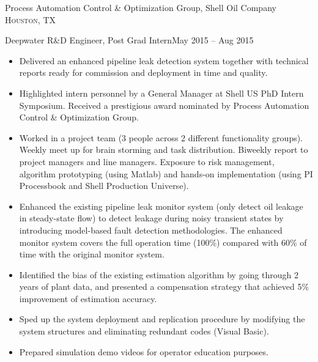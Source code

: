 \documentclass[10pt,a4paper]{article}
\begin{document}
  \headedsection
  {Process Automation Control \& Optimization Group, Shell Oil Company}
  {\textsc{Houston, TX}}
  {
    \headedsubsection
    {Deepwater R\&D Engineer, Post Grad Intern}{May 2015 -- Aug 2015}
    {
      \begin{itemize}
      \item Delivered an enhanced pipeline leak detection system together with
        technical reports ready for commission and deployment in time and
        quality.
        
      \item Highlighted intern personnel by a General Manager at Shell US PhD
        Intern Symposium. Received a prestigious award nominated by Process
        Automation Control \& Optimization Group. 
        
      \item Worked in a project team (3 people across 2 different functionality
        groups). Weekly meet up for brain storming and task distribution. Biweekly
        report to project managers and line managers. Exposure to risk management,
        algorithm prototyping (using Matlab) and hands-on implementation (using PI
        Processbook and Shell Production Universe).
        
      \item Enhanced the existing pipeline leak monitor system (only detect
        oil leakage in steady-state flow) to detect leakage during noisy
        transient states by introducing model-based fault detection
        methodologies. The enhanced monitor system covers the full operation time
        (100\%) compared with 60\% of time with the original monitor system.  
        
      \item Identified the bias of the existing estimation algorithm by going
        through 2 years of plant data, and presented a compensation strategy that
        achieved 5\% improvement of estimation accuracy.
        
      \item Sped up the system deployment and replication procedure by modifying the system
        structures and eliminating redundant codes (Visual Basic).
        
      \item Prepared simulation demo videos for operator education purposes.
      \end{itemize}
    }
  }

  \spacedhrule{0.5em}{-0.8em}
\end{document}
